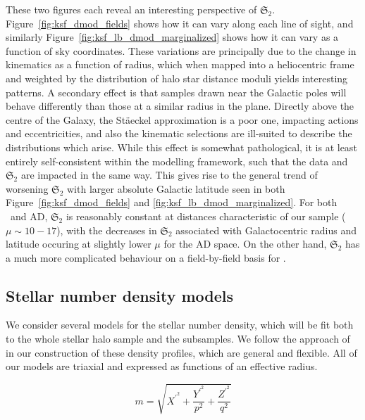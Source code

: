 These two figures each reveal an interesting perspective of $\mathfrak{S}_{2}$. Figure~\ref{fig:ksf_dmod_fields} shows how it can vary along each line of sight, and similarly Figure~\ref{fig:ksf_lb_dmod_marginalized} shows how it can vary as a function of sky coordinates. These variations are principally due to the change in kinematics as a function of radius, which when mapped into a heliocentric frame and weighted by the distribution of halo star distance moduli yields interesting patterns. A secondary effect is that samples drawn near the Galactic poles will behave differently than those at a similar radius in the plane. Directly above the centre of the Galaxy, the St\"{a}eckel approximation is a poor one, impacting actions and eccentricities, and also the kinematic selections are ill-suited to describe the distributions which arise. While this effect is somewhat pathological, it is at least entirely self-consistent within the modelling framework, such that the data and $\mathfrak{S}_{2}$ are impacted in the same way. This gives rise to the general trend of worsening $\mathfrak{S}_{2}$ with larger absolute Galactic latitude seen in both Figure~\ref{fig:ksf_dmod_fields} and \ref{fig:ksf_lb_dmod_marginalized}. For both \eLz\ and AD, $\mathfrak{S}_{2}$ is reasonably constant at distances characteristic of our sample ($\mu \sim 10-17$), with the decreases in $\mathfrak{S}_{2}$ associated with Galactocentric radius and latitude occuring at slightly lower $\mu$ for the AD space. On the other hand, $\mathfrak{S}_{2}$ has a much more complicated behaviour on a field-by-field basis for \JRLz. 

\subsection{Stellar number density models}
\label{subsec:density-models}

We consider several models for the stellar number density, which will be fit both to the whole stellar halo sample and the \gse subsamples. We follow the approach of \cite{mackereth20} in our construction of these density profiles, which are general and flexible. All of our models are triaxial and expressed as functions of an effective radius.

\begin{equation}
\label{eq:effective-radius}
m = \sqrt{ X^{\prime^{2}} + \frac{Y^{\prime^{2}}}{p^{2}} + \frac{Z^{\prime^{2}}}{q^{2}} }
\end{equation}

